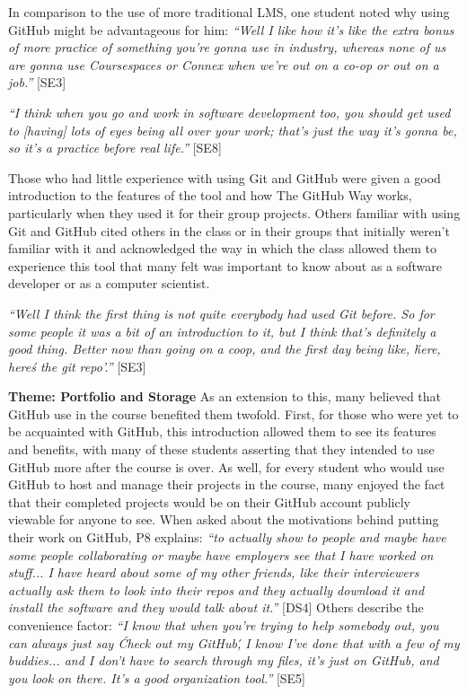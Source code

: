In comparison to the use of more traditional LMS, one student noted why using GitHub might be advantageous for him: \textit{``Well I like how it's like the extra bonus of more practice of something you're gonna use in industry, whereas none of us are gonna use Coursespaces or Connex when we're out on a co-op or out on a job.''} [SE3]

\textit{``I think when you go and work in software development too, you should get used to [having] lots of eyes being all over your work; that's just the way it's gonna be, so it's a practice before real life.''} [SE8]

Those who had little experience with using Git and GitHub were given a good introduction to the features of the tool and how The GitHub Way works, particularly when they used it for their group projects. Others familiar with using Git and GitHub cited others in the class or in their groups that initially weren't familiar with it and acknowledged the way in which the class allowed them to experience this tool that many felt was important to know about as a software developer or as a computer scientist.

\textit{``Well I think the first thing is not quite everybody had used Git before. So for some people it was a bit of an introduction to it, but I think that's definitely a good thing. Better now than going on a coop, and the first day being like, \'here, here\'s the git repo'.''} [SE3]

\textbf{Theme: Portfolio and Storage} \break
As an extension to this, many believed that GitHub use in the course benefited them twofold. First, for those who were yet to be acquainted with GitHub, this introduction allowed them to see its features and benefits, with many of these students asserting that they intended to use GitHub more after the course is over. As well, for every student who would use GitHub to host and manage their projects in the course, many enjoyed the fact that their completed projects would be on their GitHub account publicly viewable for anyone to see. When asked about the motivations behind putting their work on GitHub, P8 explains: \textit{``to actually show to people and maybe have some people collaborating or maybe have employers see that I have worked on stuff... I have heard about some of my other friends, like their interviewers actually ask them to look into their repos and they actually download it and install the software and they would talk about it.''} [DS4] Others describe the convenience factor: \textit{``I know that when you're trying to help somebody out, you can always just say \'Check out my GitHub\', I know I've done that with a few of my buddies... and I don't have to search through my files, it's just on GitHub, and you look on there. It's a good organization tool.''} [SE5]

